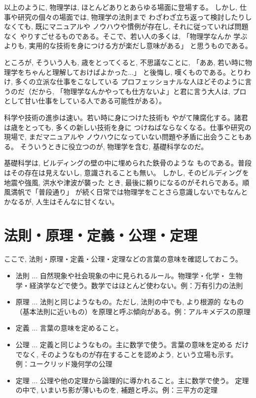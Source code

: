 以上のように, 物理学は, ほとんどありとあらゆる場面に登場する。
しかし, 仕事や研究の個々の場面では, 物理学の法則まで
わざわざ立ち返って検討したりしなくても, 既にマニュアルや
ノウハウや慣例が存在し, それに従っていれば問題なく
やりすごせるものである。そこで、若い人の多くは, 「物理学なんか
学ぶよりも, 実用的な技術を身につける方が楽だし意味がある」
と思うものである。

ところが, そういう人も, 歳をとってくると, 不思議なことに, 
「ああ, 若い時に物理学をちゃんと理解しておけばよかった...」
と後悔し, 嘆くものである。とりわけ, 多くの立派な仕事をこなしている
プロフェッショナルな人ほどそのように言うのだ（だから, 
「物理学なんかやっても仕方ないよ」と君に言う大人は, プロ
として甘い仕事をしている人である可能性がある）。

科学や技術の進歩は速い。若い時に身につけた技術も
やがて陳腐化する。諸君は歳をとっても, 多くの新しい技術を身に
つけねばならなくなる。仕事や研究の現場で, まだマニュアルや
ノウハウになっていない問題や矛盾に出会うこともある。
そういうときに役立つのが, 物理学を含む, 基礎科学なのだ。

基礎科学は, ビルディングの壁の中に埋められた鉄骨のような
ものである。普段はその存在は見えないし, 意識されることも無い。
しかし, そのビルディングを地震や強風, 洪水や津波が襲った
とき, 最後に頼りになるのがそれらである。順風満帆で「普段通り」
が続く日常では物理学をことさら意識しないでもなんとかなるが, 
人生はそんなに甘くない。
\hv


\section{法則・原理・定義・公理・定理}

ここで, 法則・原理・定義・公理・定理などの言葉の意味を確認しておこう。

\begin{itemize}
\item 法則 ... 自然現象や社会現象の中に見られるルール。物理学・化学・
生物学・経済学などで使う。数学ではほとんど使わない。例：万有引力の法則
\vspace{0.1cm}
\item 原理 ... 法則と同じようなもの。ただし, 法則の中でも, より根源的
なもの（基本法則に近いもの）を原理と呼ぶ傾向がある。例：アルキメデスの原理
\vspace{0.1cm}
\item 定義 ... 言葉の意味を定めること。
\vspace{0.1cm}
\item 公理 ... 定義と同じようなもの。主に数学で使う。言葉の意味を定める
だけでなく, そのようなものが存在することを認めよう, という立場も示す。
例：ユークリッド幾何学の公理
\vspace{0.1cm}
\item 定理 ... 公理や他の定理から論理的に導かれること。主に数学で使う。
定理の中で, いまいち影が薄いものを, 補題と呼ぶ。例：三平方の定理
\end{itemize}

